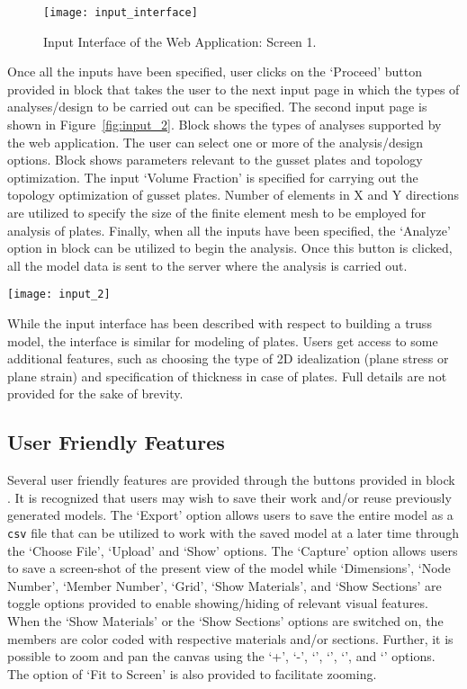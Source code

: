 \documentclass[preprint]{elsarticle}
\begin{document}
\begin{figure}[!h]
\centering
\texttt{[image: input\_interface]}
\caption{Input Interface of the Web Application: Screen 1.}
\label{fig:input}
\end{figure}


Once all the inputs have been specified, user clicks on the `Proceed' button provided in block  that takes the user to the next input page in which the types of analyses/design to be carried out can be specified. The second input page is shown in Figure~\ref{fig:input_2}. Block  shows the types of analyses supported by the web application. The user can select one or more of the analysis/design options. Block  shows parameters relevant to the gusset plates and topology optimization. The input `Volume Fraction' is specified for carrying out the topology optimization of gusset plates. Number of elements in X and Y directions are utilized to specify the size of the finite element mesh to be employed for analysis of plates. Finally, when all the inputs have been specified, the `Analyze' option in block  can be utilized to begin the analysis. Once this button is clicked, all the model data is sent to the server
where the analysis is carried out.


\begin{figure*}[!h]
\centering
\texttt{[image: input\_2]}
\caption{Input Interface of the Web Application: Screen 2.}
\label{fig:input_2}
\end{figure*}


While the input interface has been described with respect to building a truss
model, the interface is similar for modeling of plates. Users get access to some
additional features, such as choosing the type of 2D idealization (plane stress
or plane strain) and specification of thickness in case of plates. Full details are not provided for the sake of brevity.


\subsection{User Friendly Features}
Several user friendly features are provided through the buttons provided in
block .
It is recognized that users may wish to save their work and/or reuse previously
generated models. The `Export' option allows users to save the entire model as a
\texttt{csv} file that can be utilized to work with the saved model at a later
time through the `Choose File', `Upload' and `Show' options. The `Capture'
option allows users to save a screen-shot of the present view of the model while
`Dimensions', `Node Number', `Member Number', `Grid', `Show Materials', and
`Show Sections' are toggle options provided to enable showing/hiding of relevant
visual features. When the `Show Materials' or the `Show Sections' options are
switched on, the members are color coded with respective materials and/or
sections. Further, it is possible to zoom and pan the canvas using the
`+', `-', `', `', `', and `'
options. The option of `Fit to Screen' is also provided to facilitate zooming.
\end{document}
